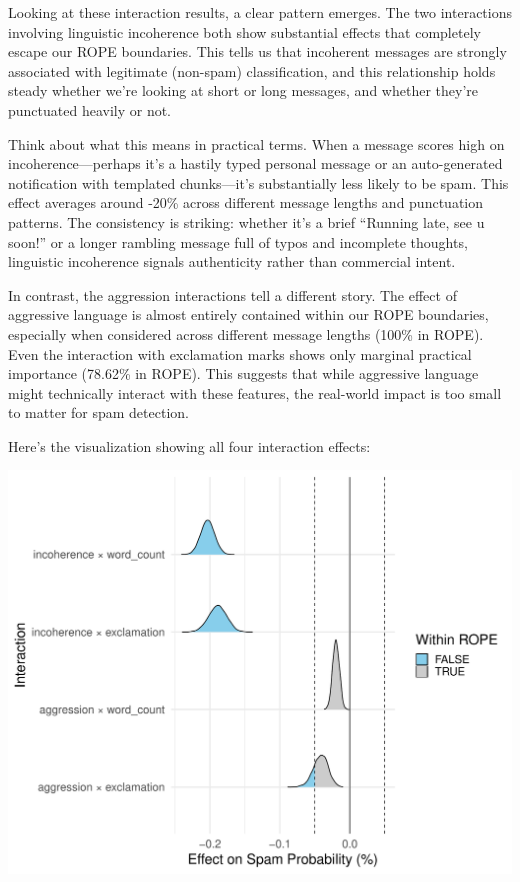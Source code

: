 \documentclass[
  letterpaper,
  DIV=11,
  numbers=noendperiod]{scrartcl}
\begin{document}
Looking at these interaction results, a clear pattern emerges. The two
interactions involving linguistic incoherence both show substantial
effects that completely escape our ROPE boundaries. This tells us that
incoherent messages are strongly associated with legitimate (non-spam)
classification, and this relationship holds steady whether we're looking
at short or long messages, and whether they're punctuated heavily or
not.

Think about what this means in practical terms. When a message scores
high on incoherence---perhaps it's a hastily typed personal message or
an auto-generated notification with templated chunks---it's
substantially less likely to be spam. This effect averages around -20\%
across different message lengths and punctuation patterns. The
consistency is striking: whether it's a brief ``Running late, see u
soon!'' or a longer rambling message full of typos and incomplete
thoughts, linguistic incoherence signals authenticity rather than
commercial intent.

In contrast, the aggression interactions tell a different story. The
effect of aggressive language is almost entirely contained within our
ROPE boundaries, especially when considered across different message
lengths (100\% in ROPE). Even the interaction with exclamation marks
shows only marginal practical importance (78.62\% in ROPE). This
suggests that while aggressive language might technically interact with
these features, the real-world impact is too small to matter for spam
detection.

Here's the visualization showing all four interaction effects:

\begin{center}
\includegraphics[width=0.8\linewidth,height=\textheight,keepaspectratio]{Beyond!!!_files/figure-pdf/unnamed-chunk-15-1.pdf}
\end{center}
\end{document}
